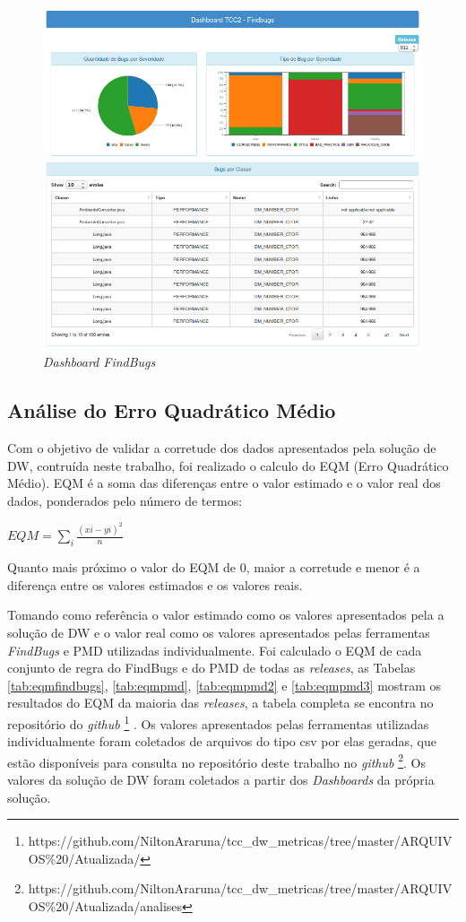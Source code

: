 \begin{figure}[H]
\centering
\includegraphics[keepaspectratio=false,scale=0.55]{figuras/figuras_nilton/DashboardFindbugs.png}
\caption{\textit{Dashboard FindBugs}}
\label{dashboardCenarios}
\end{figure}


\subsection{Análise do Erro Quadrático Médio}
\label{eqm}

Com o objetivo de validar a corretude dos dados apresentados pela solução de DW, contruída neste trabalho, foi realizado o calculo do EQM (Erro Quadrático Médio). EQM é a soma das diferenças entre
o valor estimado e o valor real dos dados, ponderados pelo número de termos: 

$ EQM = \sum\limits_{i}\frac{(x{i}-y{i})^{2}}{n} $

Quanto mais próximo o valor do EQM de 0, maior a corretude e menor é a diferença entre os valores estimados e os valores reais.

Tomando como referência o valor estimado como os valores apresentados pela a solução de DW e o valor real como os valores apresentados pelas ferramentas \textit{FindBugs} e PMD utilizadas individualmente. Foi calculado o EQM de cada conjunto de regra do FindBugs e do PMD de todas as \textit{releases}, as Tabelas \ref{tab:eqmfindbugs}, \ref{tab:eqmpmd}, \ref{tab:eqmpmd2} e \ref{tab:eqmpmd3} mostram os resultados do EQM da maioria das \textit{releases}, a tabela completa se encontra no repositório do \textit{github} \footnote{https://github.com/NiltonAraruna/tcc\_dw\_metricas/tree/master/ARQUIVOS\%20/Atualizada/}  . Os valores apresentados pelas ferramentas utilizadas individualmente foram coletados de arquivos do tipo csv por elas geradas, que estão disponíveis para consulta no repositório deste trabalho no \textit{github} \footnote{https://github.com/NiltonAraruna/tcc\_dw\_metricas/tree/master/ARQUIVOS\%20/Atualizada/analises}. Os valores da solução de DW foram coletados a partir dos \textit{Dashboards} da própria solução. 


